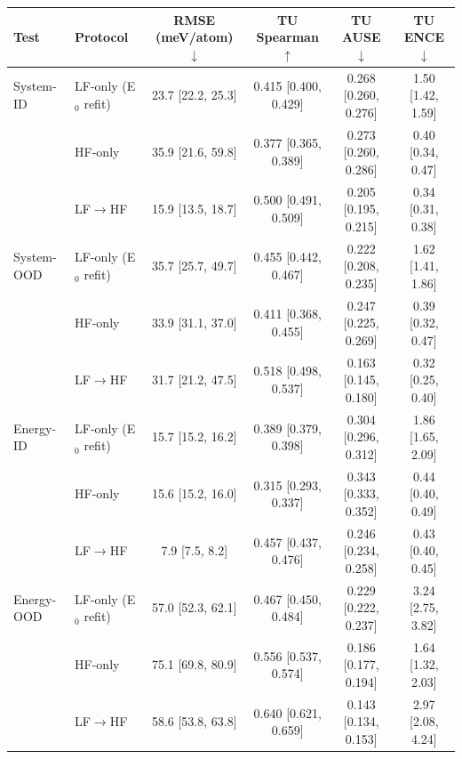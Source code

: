 \begin{tabular}{llcccc}
\toprule
Test & Protocol & RMSE (meV/atom) $\downarrow$ & TU Spearman $\uparrow$ & TU AUSE $\downarrow$ & TU ENCE $\downarrow$ \\
\midrule
System-ID & LF-only (E$_0$ refit) & 23.7 {\scriptsize [22.2, 25.3]} & 0.415 {\scriptsize [0.400, 0.429]} & 0.268 {\scriptsize [0.260, 0.276]} & 1.50 {\scriptsize [1.42, 1.59]} \\
 & HF-only & 35.9 {\scriptsize [21.6, 59.8]} & 0.377 {\scriptsize [0.365, 0.389]} & 0.273 {\scriptsize [0.260, 0.286]} & 0.40 {\scriptsize [0.34, 0.47]} \\
 & LF$\to$HF & 15.9 {\scriptsize [13.5, 18.7]} & 0.500 {\scriptsize [0.491, 0.509]} & 0.205 {\scriptsize [0.195, 0.215]} & 0.34 {\scriptsize [0.31, 0.38]} \\
\addlinespace
System-OOD & LF-only (E$_0$ refit) & 35.7 {\scriptsize [25.7, 49.7]} & 0.455 {\scriptsize [0.442, 0.467]} & 0.222 {\scriptsize [0.208, 0.235]} & 1.62 {\scriptsize [1.41, 1.86]} \\
 & HF-only & 33.9 {\scriptsize [31.1, 37.0]} & 0.411 {\scriptsize [0.368, 0.455]} & 0.247 {\scriptsize [0.225, 0.269]} & 0.39 {\scriptsize [0.32, 0.47]} \\
 & LF$\to$HF & 31.7 {\scriptsize [21.2, 47.5]} & 0.518 {\scriptsize [0.498, 0.537]} & 0.163 {\scriptsize [0.145, 0.180]} & 0.32 {\scriptsize [0.25, 0.40]} \\
\addlinespace
Energy-ID & LF-only (E$_0$ refit) & 15.7 {\scriptsize [15.2, 16.2]} & 0.389 {\scriptsize [0.379, 0.398]} & 0.304 {\scriptsize [0.296, 0.312]} & 1.86 {\scriptsize [1.65, 2.09]} \\
 & HF-only & 15.6 {\scriptsize [15.2, 16.0]} & 0.315 {\scriptsize [0.293, 0.337]} & 0.343 {\scriptsize [0.333, 0.352]} & 0.44 {\scriptsize [0.40, 0.49]} \\
 & LF$\to$HF & 7.9 {\scriptsize [7.5, 8.2]} & 0.457 {\scriptsize [0.437, 0.476]} & 0.246 {\scriptsize [0.234, 0.258]} & 0.43 {\scriptsize [0.40, 0.45]} \\
\addlinespace
Energy-OOD & LF-only (E$_0$ refit) & 57.0 {\scriptsize [52.3, 62.1]} & 0.467 {\scriptsize [0.450, 0.484]} & 0.229 {\scriptsize [0.222, 0.237]} & 3.24 {\scriptsize [2.75, 3.82]} \\
 & HF-only & 75.1 {\scriptsize [69.8, 80.9]} & 0.556 {\scriptsize [0.537, 0.574]} & 0.186 {\scriptsize [0.177, 0.194]} & 1.64 {\scriptsize [1.32, 2.03]} \\
 & LF$\to$HF & 58.6 {\scriptsize [53.8, 63.8]} & 0.640 {\scriptsize [0.621, 0.659]} & 0.143 {\scriptsize [0.134, 0.153]} & 2.97 {\scriptsize [2.08, 4.24]} \\
\bottomrule
\end{tabular}
